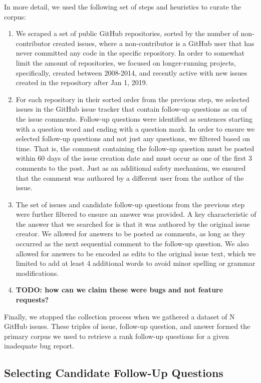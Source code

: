 In more detail, we used the following set of steps and heuristics to curate the corpus:
\begin{enumerate}
\item We scraped a set of public GitHub repositories, sorted by the number of
non-contributor created issues, where a non-contributor is a GitHub user that has never
committed any code in the specific repository. In order to somewhat limit the amount of repositories,
we focused on longer-running projects, specifically, created between 2008-2014, and recently
active with new issues created in the repository after Jan 1, 2019.
\item For each repository in their sorted order from the previous step, we selected issues in the GitHub issue tracker
that contain follow-up questions as on of the issue comments.  Follow-up questions were identified as sentences starting with a question word and ending with a question mark. In order to ensure we selected follow-up questions and not just
any questions, we filtered based on time. That is, the comment containing the follow-up question must be posted
within 60 days of the issue creation date and must occur as one of the first 3 comments to the post. Just as an additional safety mechanism,
we ensured that the comment was authored by a different user from the author of the issue.
\item The set of issues and candidate follow-up questions from the previous step were further filtered to
ensure an answer was provided. A key characteristic of the answer that we searched for is that it was authored
by the original issue creator. We allowed for answers to be posted as comments, as long as they occurred as the next sequential comment
to the follow-up question. We also allowed for answers to be encoded as edits to the original issue text, which we limited to add at least 4 additional words to avoid minor spelling or grammar modifications.
\item {\bf TODO: how can we claim these were bugs and not feature requests?}
\end{enumerate}

Finally, we stopped the collection process when we gathered a dataset of N GitHub issues. These triples of
issue, follow-up question, and answer formed the primary corpus we used to retrieve a rank follow-up questions
for a given inadequate bug report.

\subsection{Selecting Candidate Follow-Up Questions}

